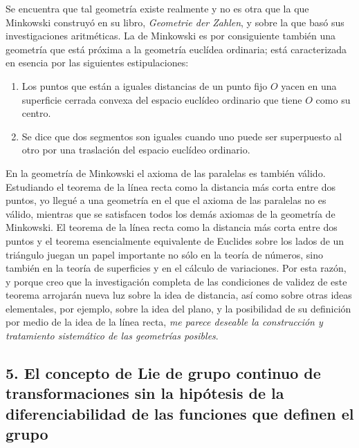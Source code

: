 \documentclass[a4paper, 12pt]{article}
\begin{document}
Se encuentra que tal geometría existe realmente y no es otra que la que Minkowski construyó en su libro, \textit{Geometrie der Zahlen}, y sobre la que basó sus investigaciones aritméticas. La de Minkowski es por consiguiente también una geometría que está próxima a la geometría euclídea ordinaria; está caracterizada en esencia por las siguientes estipulaciones:

\begin{enumerate}

\item  Los puntos que están a iguales distancias de un punto fijo $O$ yacen en una superficie cerrada convexa del espacio euclídeo ordinario que tiene $O$ como su centro.

\item Se dice que dos segmentos son iguales cuando uno puede ser superpuesto al otro por una traslación del espacio euclídeo ordinario.

\end{enumerate}

En la geometría de Minkowski el axioma de las paralelas es también válido. Estudiando el teorema de la línea recta como la distancia más corta entre dos puntos, yo llegué a una geometría en el que el axioma de las paralelas no es válido, mientras que se satisfacen todos los demás axiomas de la geometría de Minkowski. El teorema de la línea recta como la distancia más corta entre dos puntos y el teorema esencialmente equivalente de Euclides sobre los lados de un triángulo juegan un papel importante no sólo en la teoría de números, sino también en la teoría de superficies y en el cálculo de variaciones. Por esta razón, y porque creo que la investigación completa de las condiciones de validez de este teorema arrojarán nueva luz sobre la idea de distancia, así como sobre otras ideas elementales, por ejemplo, sobre la idea del plano, y la posibilidad de su definición por medio de la idea de la línea recta, \textit{me parece deseable la construcción y tratamiento sistemático de las geometrías posibles}. 


\subsection*{5. El concepto de Lie de grupo continuo de transformaciones sin la hipótesis de la diferenciabilidad de las funciones que definen el grupo} 
\end{document}
